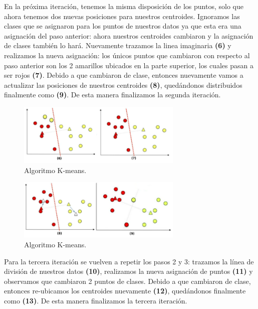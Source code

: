 \documentclass[12pt,a4paper]{article}
\begin{document}
\begin{sloppypar}
En la próxima iteración, tenemos la misma disposición de los puntos, solo que ahora tenemos dos nuevas posiciones para nuestros centroides. Ignoramos las clases que se asignaron para los puntos de nuestros datos ya que esta era una asignación del paso anterior: ahora nuestros centroides cambiaron y la asignación de clases también lo hará. Nuevamente trazamos la linea imaginaria \textbf{(6)} y realizamos la nueva asignación: los únicos puntos que cambiaron con respecto al paso anterior son los 2 amarillos ubicados en la parte superior, los cuales pasan a ser rojos \textbf{(7)}. Debido a que cambiaron de clase, entonces nuevamente vamos a actualizar las posiciones de nuestros centroides \textbf{(8)}, quedándonos distribuidos finalmente como \textbf{(9)}. De esta manera finalizamos la segunda iteración. 

\begin{figure}[H]    %
 \centering
 \includegraphics[width=0.7\textwidth]{images/K_Means_3.png}
 \captionsetup{justification=centering,margin=2cm}
 \caption{Algoritmo K-means.}
\end{figure}

\begin{figure}[H]    %
 \centering
 \includegraphics[width=0.7\textwidth]{images/K_Means_4.png}
 \captionsetup{justification=centering,margin=2cm}
 \caption{Algoritmo K-means.}
\end{figure}

Para la tercera iteración se vuelven a repetir los pasos 2 y 3: trazamos la línea de división de nuestros datos \textbf{(10)}, realizamos la nueva asignación de puntos \textbf{(11)} y observamos que cambiaron 2 puntos de clases.  Debido a que cambiaron de clase, entonces re-ubicamos los centroides nuevamente \textbf{(12)}, quedándonos finalmente como \textbf{(13)}.  De esta manera finalizamos la tercera iteración. 


\end{sloppypar}
\end{document}
